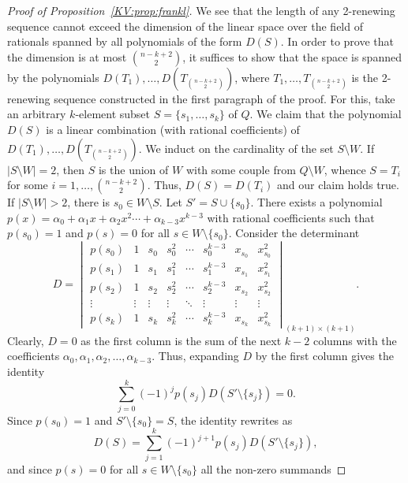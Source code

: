 \documentclass{irmaart}
\theoremstyle{plain}
\begin{document}
\begin{proof}[Proof of Proposition~\ref{KV:prop:frankl}]
We see that the length of any 2-renewing sequence cannot exceed the dimension
of the linear space over the field of rationals spanned by all polynomials of
the form $D(S)$. In order to prove that the dimension is at most
$\binom{n-k+2}2$, it suffices to show that the space is spanned by the
polynomials $D(T_1),\dots,D(T_{\binom{n-k+2}2})$, where
$T_1,\dots,T_{\binom{n-k+2}2}$ is the 2-renewing sequence constructed in the
first paragraph of the proof. For this, take an arbitrary $k$-element subset
$S=\{s_1,\dots,s_k\}$ of $Q$. We claim that the polynomial $D(S)$ is a linear
combination (with rational coefficients) of
$D(T_1),\dots,D(T_{\binom{n-k+2}2})$. We induct on the cardinality of the set
$S\setminus W$. If $|S\setminus W|=2$, then $S$ is the union of $W$ with some
couple from $Q\setminus W$, whence $S=T_i$ for some $i=1,\dots,\binom{n-k+2}2$.
Thus, $D(S)=D(T_i)$ and our claim holds true. If $|S\setminus W|>2$, there is
$s_0\in W\setminus S$. Let $S'=S\cup\{s_0\}$. There exists a polynomial
$p(x)=\alpha_0+\alpha_1x+\alpha_2x^2\cdots+\alpha_{k-3}x^{k-3}$ with rational
coefficients such that $p(s_0)=1$ and $p(s)=0$ for all $s\in
W\setminus\{s_0\}$. Consider the determinant
\begin{displaymath}
D=\begin{vmatrix}
p(s_0) & 1 & s_0 & s_0^2 & \cdots & s_0^{k-3} & x_{s_0} & x_{s_0}^2\\
p(s_1) & 1 & s_1 & s_1^2 & \cdots & s_1^{k-3} & x_{s_1} & x_{s_1}^2\\
p(s_2) & 1 & s_2 & s_2^2 & \cdots & s_2^{k-3} & x_{s_2} & x_{s_2}^2\\
\vdots & \vdots & \vdots & \vdots & \ddots & \vdots & \vdots & \vdots\\
p(s_k) & 1 & s_k & s_k^2 & \cdots & s_k^{k-3} & x_{s_k} & x_{s_k}^2
\end{vmatrix}_{(k+1)\times (k+1)}.
\end{displaymath}
Clearly, $D=0$ as the first column is the sum of the next $k-2$ columns with
the coefficients $\alpha_0,\alpha_1,\alpha_2,\dots,\alpha_{k-3}$. Thus,
expanding $D$ by the first column gives the identity
\begin{displaymath}
\sum_{j=0}^{k}(-1)^jp(s_j)D(S'\setminus\{s_j\})=0.
\end{displaymath}
Since $p(s_0)=1$ and $S'\setminus\{s_0\}=S$, the identity rewrites as
\begin{equation}
\label{KV:eq:combination}
D(S)=\sum_{j=1}^{k}(-1)^{j+1}p(s_j)D(S'\setminus\{s_j\}),
\end{equation}
and since $p(s)=0$ for all $s\in W\setminus\{s_0\}$ all the non-zero summands

\end{proof}
\end{document}
